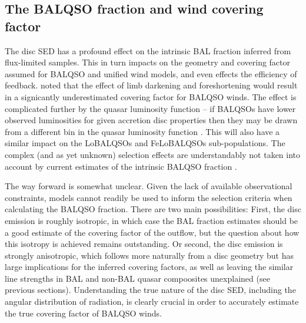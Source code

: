 \documentclass[useAMS,usenatbib]{mn2e_x}
\begin{document}
\subsection{The BALQSO fraction and wind covering factor}
\label{sec:balfrac}

The disc SED has a profound effect on the intrinsic BAL fraction
inferred from flux-limited samples. This in turn impacts on 
the geometry and covering factor assumed for BALQSO and unified wind models,
and even effects the efficiency of feedback.
\cite{krolik1998} noted that the effect of limb darkening and foreshortening
would result in a signicantly underestimated covering factor for BALQSO winds.
The effect is complicated further by the quasar luminosity function -- if 
BALQSOs have lower observed luminosities for given accretion disc properties 
then they may be drawn from a different bin in the quasar luminosity function 
\citep{goodrich1997}. This will also have a similar impact
on the LoBALQSOs and FeLoBALQSOs sub-populations.
The complex (and as yet unknown) selection effects are understandably 
not taken into account by current estimates of the intrinsic BALQSO fraction 
\citep{weymann1991, reichard2003, knigge2008, turnermiller2009, allen2011}. 

The way forward is somewhat unclear. Given the lack of available observational 
constraints, models cannot readily be used to inform the selection criteria when 
calculating the BALQSO fraction. There are two main possibilities:
First, the disc emission is roughly isotropic, in which case the BAL fraction
estimates should be a good estimate of the covering factor of the outflow,
but the question about how this isotropy is achieved remains outstanding.
Or second, the disc emission is strongly anisotropic, which follows more
naturally from a disc geometry but has large implications
for the inferred covering factors, as well as leaving the similar line strengths
in BAL and non-BAL quasar compoosites unexplained (see previous sections).
Understanding the true nature of the disc SED, including the
angular distribution of radiation, is clearly crucial in order
to accurately estimate the true covering factor of BALQSO winds.

\end{document}
